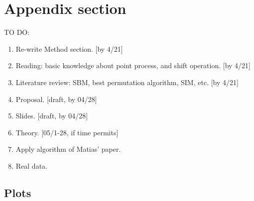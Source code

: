 
\appendix

\section{Appendix section}\label{app}

TO DO:
\begin{enumerate}
	\item Re-write Method section. [by 4/21]
	\item Reading: basic knowledge about point process, and shift operation. [by 4/21] %
	\item Literature review: SBM, best permutation algorithm, SIM, etc. [by 4/21]
	\item Proposal. [draft, by 04/28]
	\item Slides. [draft, by 04/28]
	\item Theory. [05/1-28, if time permits]
	\item Apply algorithm of Matias' paper.
	\item Real data. 
	
\end{enumerate}

\subsection{Plots}



